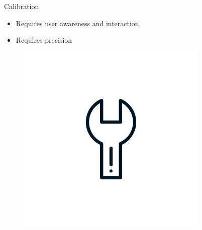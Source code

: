\documentclass[aspectratio=169]{beamer}
[aspectratio=169] %
\begin{document}
\begin{frame}{Calibration}
  \begin{minipage}{0.49\textwidth} 
    \begin{itemize}
      \item Requires user awareness and interaction
      \item Requires precision
    \end{itemize}
  \end{minipage}
  \hfill
  \begin{minipage}{0.49\textwidth} 
    \begin{figure}
      \centering
      \includegraphics[height=0.5\textheight]{figures/tool.png}
    \end{figure}
  \end{minipage}
\end{frame}

\end{document}
